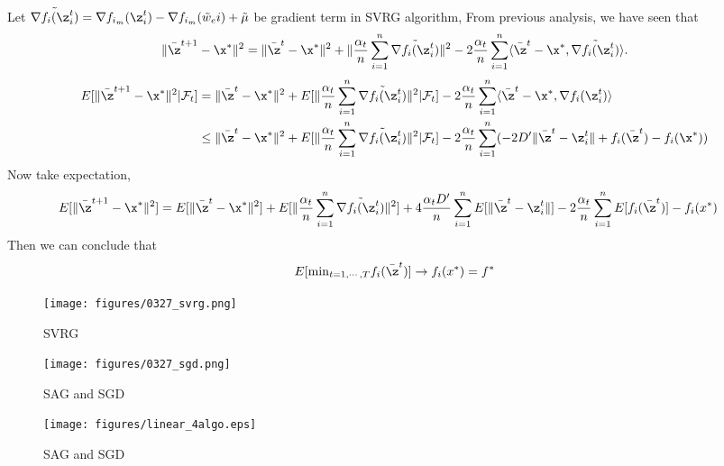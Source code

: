 \documentclass[a4paper,11pt]{article}
\begin{document}
Let $\Tilde{\nabla f_i(\z_i^t)}=\nabla f_{i_m}(\z_i^t)-\nabla f_{i_m}(\Tilde{w}_e{i})+\Tilde{\mu} $ be gradient term in SVRG algorithm, 
From previous analysis, we have seen that \begin{equation}
    \|\Bar{\z}^{t+1}-\x^* \|^2= \|\Bar{\z}^{t}-\x^* \|^2+\|\frac{\alpha_t}{n}\sum_{i=1}^n \Tilde{\nabla f_i(\z_i^t)} \|^2-2\frac{\alpha_t}{n}\sum_{i=1}^n \langle \Bar{\z}^{t}-\x^*, \Tilde{\nabla f_i(\z_i^t)} \rangle.
\end{equation}
\begin{align*}
    E[\|\Bar{\z}^{t+1}-\x^* \|^2 |\mathcal{F}_t] & = \|\Bar{\z}^{t}-\x^* \|^2 + E[\|\frac{\alpha_t}{n}\sum_{i=1}^n \Tilde{\nabla f_i(\z_i^t)} \|^2 |\mathcal{F}_t]-2\frac{\alpha_t}{n}\sum_{i=1}^n \langle \Bar{\z}^{t}-\x^*, \nabla f_i(\z_i^t) \rangle \\
    & \leq \|\Bar{\z}^{t}-\x^* \|^2 + E[\|\frac{\alpha_t}{n}\sum_{i=1}^n \Tilde{\nabla f_i(\z_i^t)} \|^2 |\mathcal{F}_t]-2\frac{\alpha_t}{n}\sum_{i=1}^n (-2D'\|\Bar{\z}^{t}-\z_i^t \|+f_i(\Bar{\z}^t)-f_i(\x^*))
\end{align*}
Now take expectation, 
\begin{align*}
    E[\|\Bar{\z}^{t+1}-\x^* \|^2] & = E[\|\Bar{\z}^{t}-\x^* \|^2] + E[\|\frac{\alpha_t}{n}\sum_{i=1}^n \Tilde{\nabla f_i(\z_i^t)} \|^2 ]+4\frac{\alpha_t D'}{n}\sum_{i=1}^n E[\|\Bar{\z}^{t}-\z_i^t \| ]-2\frac{\alpha_t }{n}\sum_{i=1}^n E[f_i(\Bar{\z}^t )]-f_i(x^*)
\end{align*}
Then we can conclude that 
\begin{equation*}
    E[\mathrm{min}_{t=1, \cdots, T}f_i(\Bar{\z}^{t})] \to f_i(x^*) =f^*
\end{equation*}

\begin{figure}
    \centering
    \texttt{[image: figures/0327\_svrg.png]}
    \caption{SVRG}
    \label{fig:my_label}
\end{figure}
\begin{figure}
    \centering
    \texttt{[image: figures/0327\_sgd.png]}
    \caption{SAG and SGD}
    \label{fig:my_label}
\end{figure}

\begin{figure}
    \centering
    \texttt{[image: figures/linear\_4algo.eps]}
    \caption{SAG and SGD}
    \label{fig:my_label}
\end{figure}
\end{document}

